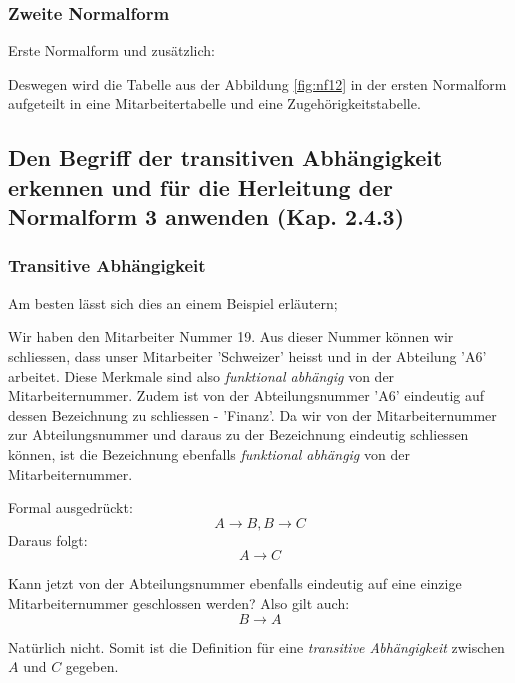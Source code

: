 \subsubsection{Zweite Normalform}
Erste Normalform und zusätzlich:
\begin{center}
\end{center}


Deswegen wird die Tabelle aus der Abbildung \ref{fig:nf12} in der ersten Normalform aufgeteilt in eine Mitarbeitertabelle und eine Zugehörigkeitstabelle.

\subsection{Den Begriff der transitiven Abhängigkeit erkennen und für die Herleitung der Normalform 3 anwenden (Kap. 2.4.3)}
\subsubsection{Transitive Abhängigkeit}
Am besten lässt sich dies an einem Beispiel erläutern;

Wir haben den Mitarbeiter Nummer 19. Aus dieser Nummer können wir schliessen, dass unser Mitarbeiter 'Schweizer' heisst und in der Abteilung 'A6' arbeitet. Diese Merkmale sind also \emph{funktional abhängig} von der Mitarbeiternummer. Zudem ist von der Abteilungsnummer 'A6' eindeutig auf dessen Bezeichnung zu schliessen - 'Finanz'. Da wir von der Mitarbeiternummer zur Abteilungsnummer und daraus zu der Bezeichnung eindeutig schliessen können, ist die Bezeichnung ebenfalls \emph{funktional abhängig} von der Mitarbeiternummer.

Formal ausgedrückt:
\begin{equation*}
    A\rightarrow B , B\rightarrow C
\end{equation*}
Daraus folgt:
\begin{equation*}
    A\rightarrow C
\end{equation*}

Kann jetzt von der Abteilungsnummer ebenfalls eindeutig auf eine einzige Mitarbeiternummer geschlossen werden? Also gilt auch:
\begin{equation*}
    B\rightarrow A
\end{equation*}

Natürlich nicht. Somit ist die Definition für eine \emph{transitive Abhängigkeit} zwischen \(A\) und \(C\) gegeben.

